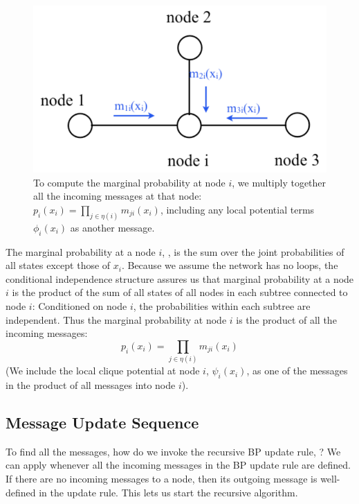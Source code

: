 \begin{figure}
\centerline{\includegraphics[width=0.48\linewidth]{figures/graphical_models/bpi.pdf}} 
\caption{To compute the marginal probability at node $i$, we multiply
 together all the incoming messages at that node:  
$p_{i}(x_i) =  \prod_{j\in \eta(i)}  m_{ji}(x_i)$, including any local potential terms $\phi_i(x_i)$ as another message.
}
\label{fig:bpi}
\end{figure}
 
The marginal probability at a node $i$, \eqn{\ref{eq:discreteMarginalization}}, is the sum over the joint probabilities of all states except those of $x_i$.  Because we assume the network has no loops, the conditional
independence structure assures us that marginal probability at a node $i$ is the product of the sum of all states of all nodes in each
subtree connected to node $i$: Conditioned on node $i$, the probabilities within each subtree are independent. Thus the marginal probability at node $i$
is the product of all the incoming messages:
\begin{equation}
p_{i}(x_i) = \prod_{j\in \eta(i)}  m_{ji}(x_i)
\label{eq:bpmarginal}
\end{equation}
(We include the local clique potential at node $i$, $\psi_i(x_i)$, as
one of the messages in the product of all messages into node $i$).


\subsection{Message Update Sequence}
To find all the messages, how do we invoke the recursive BP update rule, \eqn{\ref{eq:bpupdate}}?  We can apply \eqn{\ref{eq:bpupdate}}
whenever all the incoming messages in the BP update rule are defined.  If there
 are no incoming messages to a node, then its outgoing message is
well-defined in the update rule.  This lets us start the recursive algorithm.

